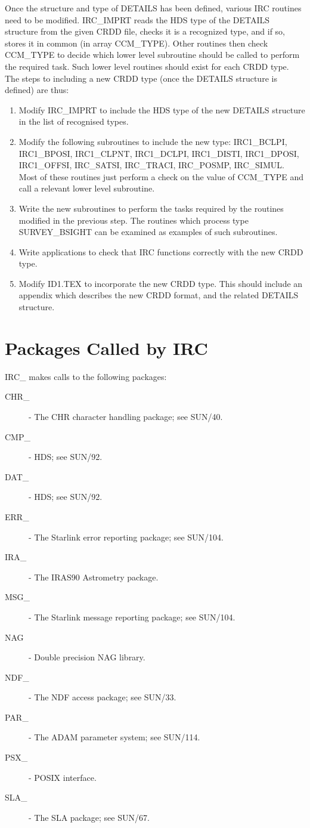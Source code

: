 Once the structure and type of DETAILS has been defined, various IRC routines
need to be modified. IRC\_IMPRT reads the HDS type of the DETAILS structure
from the given CRDD file, checks it is a recognized type, and if so, stores it
in common (in array CCM\_TYPE). Other routines then check CCM\_TYPE to decide
which lower level subroutine should be called to perform the required task.
Such lower level routines should exist for each CRDD type. The steps to
including a new CRDD type (once the DETAILS structure is defined) are thus:

\begin {enumerate}
\item Modify IRC\_IMPRT to include the HDS type of the new DETAILS structure in
the list of recognised types.
\item Modify the following subroutines to include the new type: IRC1\_BCLPI,
IRC1\_BPOSI, IRC1\_CLPNT, IRC1\_DCLPI, IRC1\_DISTI, IRC1\_DPOSI, IRC1\_OFFSI,
IRC\_SATSI, IRC\_TRACI, IRC\_POSMP, IRC\_SIMUL. Most of these routines just
perform a check on the value of CCM\_TYPE and call a relevant lower level
subroutine.
\item Write the new subroutines to perform the tasks required by the routines
modified in the previous step. The routines which process type SURVEY\_BSIGHT
can be examined as examples of such subroutines.
\item Write applications to check that IRC functions correctly with the new CRDD
type.
\item Modify ID1.TEX to incorporate the new CRDD type. This should include an
appendix which describes the new CRDD format, and the related DETAILS structure.
\end {enumerate}

\section {Packages Called by IRC}
IRC\_ makes calls to the following packages:
\begin {description}
\item [CHR\_] - The CHR character handling package; see SUN/40.
\item [CMP\_] - HDS; see SUN/92.
\item [DAT\_] - HDS; see SUN/92.
\item [ERR\_] - The Starlink error reporting package; see SUN/104.
\item [IRA\_] - The IRAS90 Astrometry package.
\item [MSG\_] - The Starlink message reporting package; see SUN/104.
\item [NAG] - Double precision NAG library.
\item [NDF\_] - The NDF access package; see SUN/33.
\item [PAR\_] - The ADAM parameter system; see SUN/114.
\item [PSX\_] - POSIX interface.
\item [SLA\_] - The SLA package; see SUN/67.
\end{description}

